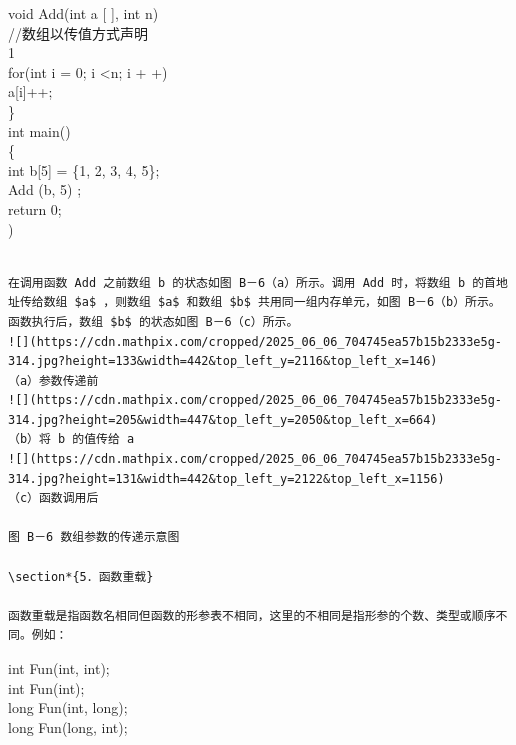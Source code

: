 \documentclass[10pt]{article}
\begin{document}
void Add(int a [ ], int n)\\
//数组以传值方式声明\\
1\\
for(int i = 0; i <n; i + +)\\[0pt]
a[i]++;\\
\}\\
int main()\\
\{\\[0pt]
int b[5] = \{1, 2, 3, 4, 5\};\\
Add (b, 5) ;\\
return 0;\\
)

\begin{verbatim}

在调用函数 Add 之前数组 b 的状态如图 B－6（a）所示。调用 Add 时，将数组 b 的首地址传给数组 $a$ ，则数组 $a$ 和数组 $b$ 共用同一组内存单元，如图 B－6（b）所示。函数执行后，数组 $b$ 的状态如图 B－6（c）所示。
![](https://cdn.mathpix.com/cropped/2025_06_06_704745ea57b15b2333e5g-314.jpg?height=133&width=442&top_left_y=2116&top_left_x=146)
（a）参数传递前
![](https://cdn.mathpix.com/cropped/2025_06_06_704745ea57b15b2333e5g-314.jpg?height=205&width=447&top_left_y=2050&top_left_x=664)
（b）将 b 的值传给 a
![](https://cdn.mathpix.com/cropped/2025_06_06_704745ea57b15b2333e5g-314.jpg?height=131&width=442&top_left_y=2122&top_left_x=1156)
（c）函数调用后

图 B－6 数组参数的传递示意图

\section*{5．函数重载}

函数重载是指函数名相同但函数的形参表不相同，这里的不相同是指形参的个数、类型或顺序不同。例如：
\end{verbatim}

int Fun(int, int);\\
int Fun(int);\\
long Fun(int, long);\\
long Fun(long, int);
\end{document}
